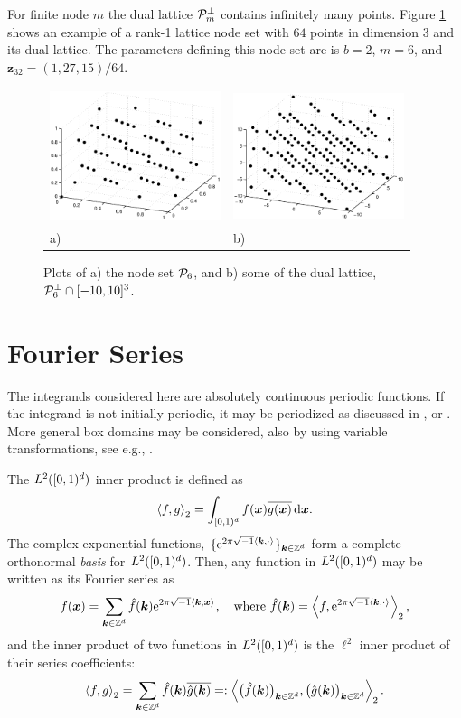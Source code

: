 \documentclass[graybox]{svmult}
\newcommand{\Z}{\mathbb{Z}} %
\newcommand{\bsx}{\boldsymbol{x}}    %
\newcommand{\bsz}{\boldsymbol{z}}    %
\begin{document}
For finite node $m$ the dual lattice $\mathcal{P}^{\perp}_{m}$ contains infinitely many points. Figure \ref{Latticefig} shows an example of a rank-1 lattice node set with $64$ points in dimension $3$ and its dual lattice. The parameters defining this node set are is $b=2$, $m=6$, and $\bsz_{32}=(1,27,15)/64$.
\begin{figure}[h!]
\centering
\begin{tabular}{>{\centering}p{5cm}>{\centering}p{5cm}}
\includegraphics[width=5cm]{Images/Lattice64.eps} &
\includegraphics[width=5cm]{Images/DualLattice64.eps}\tabularnewline
a) & b)
\end{tabular}
\caption{Plots of a) the node set $\mathcal{P}_6$, and b) some of the dual lattice, $\mathcal{P}_6^{\perp} \cap [-10,10]^3$.}\label{Latticefig}
\end{figure}

\section{Fourier Series}\label{secfourierseries}

The integrands considered here are absolutely continuous periodic functions. If the integrand is not initially periodic, it may be periodized as discussed in \cite{Hic01a}, \cite[Sec. 2.12]{SloJoe94} or \cite{Sid93}. More general box domains may be considered, also by using variable transformations, see e.g.,  \cite{HicSloWas03a,HicSloWas03e}.

The $L^2([0,1)^d)$ inner product is defined as
\[
\ip[2]{f}{g} = \int_{\cube} f(\bsx) \overline{g(\bsx)} \, \dif \bsx.
\]
The complex exponential functions, $\{\E^{2 \pi \sqrt{-1} \ip{\bsk}{\cdot}}\}_{\bsk \in \Z^d}$ form a complete orthonormal \emph{basis} for $L^2([0,1)^d)$. Then, any function in $L^2([0,1)^d)$ may be written as its Fourier series as
\begin{equation} \label{Fourierdef}
f(\bsx) = \sum_{\bsk \in \Z^d} \hf(\bsk) \E^{2 \pi \sqrt{-1} \ip{\bsk}{\bsx}}, \quad \text{where } \hf(\bsk) = \ip[2]{f}{\E^{2 \pi \sqrt{-1} \ip{\bsk}{\cdot}}},
\end{equation}
and the inner product of two functions in $L^2([0,1)^d)$ is the $\ell^2$ inner product of their series coefficients:
\[
\ip[2]{f}{g} = \sum_{\bsk \in \Z^d} \hf(\bsk)\overline{\hg(\bsk)} =: \ip[2]{\bigl(\hf(\bsk)\bigr)_{\bsk \in \Z^d}}{\bigl ( \hg(\bsk)\bigr )_{\bsk \in \Z^d}}.
\]
\end{document}
